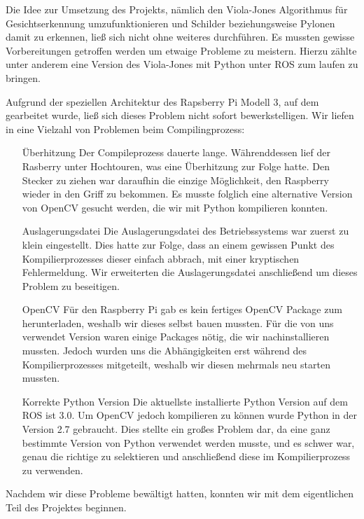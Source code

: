 Die Idee zur Umsetzung des Projekts, nämlich den Viola-Jones Algorithmus 
für Gesichtserkennung umzufunktionieren und Schilder beziehungsweise 
Pylonen damit zu erkennen, ließ sich nicht ohne weiteres durchführen.
Es mussten gewisse Vorbereitungen getroffen werden um etwaige Probleme 
zu meistern. Hierzu zählte unter anderem eine Version des 
Viola-Jones mit Python unter ROS zum laufen zu bringen.
\par
Aufgrund der speziellen Architektur des Rapsberry Pi Modell 3, auf dem 
gearbeitet wurde, ließ sich dieses Problem nicht sofort bewerkstelligen. 
Wir liefen in eine Vielzahl von Problemen beim Compilingprozess:
\begin{itemize}
\item[Überhitzung] Der Compileprozess dauerte lange. Währenddessen lief 
der Rasberry unter Hochtouren, was eine Überhitzung zur Folge hatte. Den 
Stecker zu ziehen war daraufhin die einzige Möglichkeit, den Raspberry 
wieder in den Griff zu bekommen. Es musste folglich eine alternative 
Version von OpenCV gesucht werden, die wir mit Python kompilieren 
konnten.
\item[Auslagerungsdatei] Die Auslagerungsdatei des Betriebssystems war 
zuerst zu klein eingestellt. Dies hatte zur Folge, dass an einem 
gewissen Punkt des Kompilierprozesses dieser einfach abbrach, mit einer 
kryptischen Fehlermeldung. Wir erweiterten die Auslagerungsdatei 
anschließend um dieses Problem zu beseitigen.
\item[OpenCV] Für den Raspberry Pi gab es kein fertiges OpenCV Package 
zum herunterladen, weshalb wir dieses selbst bauen mussten. Für die von 
uns verwendet Version waren einige Packages nötig, die wir 
nachinstallieren mussten. Jedoch wurden uns die Abhängigkeiten erst 
während des Kompilierprozesses mitgeteilt, weshalb wir diesen mehrmals 
neu starten mussten.
\item[Korrekte Python Version] Die aktuellste installierte Python 
Version auf dem ROS ist 3.0. Um OpenCV jedoch kompilieren zu können 
wurde Python in der Version 2.7 gebraucht. Dies stellte ein großes 
Problem dar, da eine ganz bestimmte Version von Python verwendet werden 
musste, und es schwer war, genau die richtige zu selektieren und 
anschließend diese im Kompilierprozess zu verwenden.
\end{itemize}
Nachdem wir diese Probleme bewältigt hatten, konnten wir mit dem 
eigentlichen Teil des Projektes beginnen.
